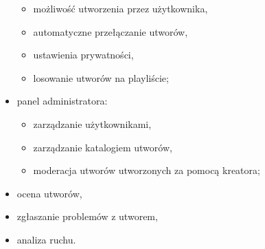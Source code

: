 \documentclass[11pt]{article}
\begin{document}
\begin{itemize}
    \begin{itemize}
      \item możliwość utworzenia przez użytkownika,
      \item automatyczne przełączanie utworów,
      \item ustawienia prywatności,
      \item losowanie utworów na playliście;
    \end{itemize}
    \item panel administratora:
    \begin{itemize}
      \item zarządzanie użytkownikami,
      \item zarządzanie katalogiem utworów,
      \item moderacja utworów utworzonych za pomocą kreatora;
    \end{itemize}
    \item ocena utworów,
    \item zgłaszanie problemów z utworem,
    \item analiza ruchu.
  \end{itemize}
\end{document}
